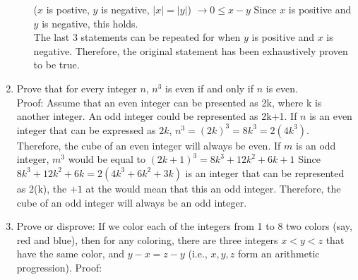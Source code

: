 \documentclass{article}
\begin{document}
\begin{enumerate}
\begin{enumerate}
            ($x$ is postive, $y$ is negative, $|x| = |y|$) $\rightarrow 0 \leq x - y$  Since $x$ is positive and $y$ is negative, this holds. \\
            The last 3 statements can be repeated for when $y$ is positive and $x$ is negative. Therefore, the original statement has been exhaustively proven to be true. \Squaresteel
    \end{enumerate}
\item Prove that for every integer $n$, $n^3$ is even if and only if $n$ is even. \\
    Proof: Assume that an even integer can be presented as 2k, where k is another integer. An odd integer could be represented as 2k+1. If $n$ is an even integer that can be expressed as $2k$, $n^3 = (2k)^3 = 8k^3 = 2(4k^3)$. Therefore, the cube of an even integer will always be even. If $m$ is an odd integer, $m^3$ would be equal to $(2k+1)^3 = 8k^3 + 12k^2 + 6k + 1$ Since $8k^3 + 12k^2 + 6k = 2(4k^3+6k^2+3k)$ is an integer that can be represented as 2(k), the $+1$ at the would mean that this an odd integer. Therefore, the cube of an odd integer will always be an odd integer.
\item Prove or disprove: If we color each of the integers from 1 to 8 two colors (say, red and blue), then for any coloring, there are three integers $x<y<z$ that have the same color, and $y-x=z-y$ (i.e., $x,y,z$ form an arithmetic progression).
    Proof:
\end{enumerate}
\end{document}
